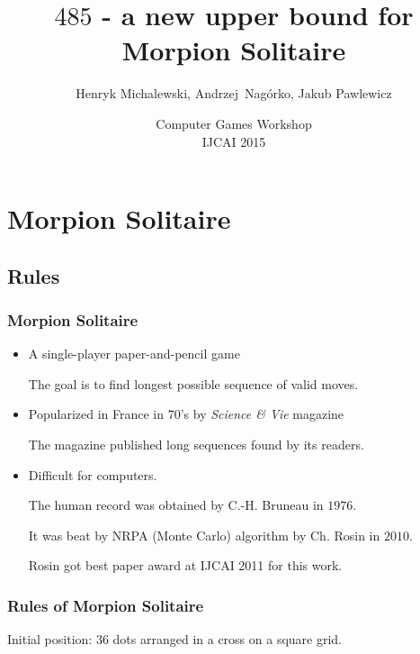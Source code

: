 \documentclass[pdftex]{beamer}
\title{$485$ - a new upper bound for Morpion Solitaire}
\author[H.~Michalewski, A.~Nagórko, J.~Pawlewicz]{Henryk Michalewski, Andrzej~Nag\'orko, Jakub Pawlewicz}
\institute[Warsaw]
{
University of Warsaw
}
\date[July 2015]{Computer Games Workshop\\\vspace{3mm} IJCAI 2015}
\begin{document}
\begin{frame}[plain]
  \titlepage

\end{frame}

%
%

\section{Morpion Solitaire}
\subsection{Rules}

\begin{frame}
\frametitle{Morpion Solitaire}

\begin{itemize}
\item A single-player paper-and-pencil game

\vspace{3mm}
{\footnotesize The goal is to find longest possible sequence of valid moves.}

\vspace{8mm}
\item Popularized in France in 70's by {\em Science \& Vie} magazine

\vspace{3mm}
{\footnotesize The magazine published long sequences found by its readers.}

\vspace{8mm}
\item Difficult for computers. 

\vspace{3mm}
{\footnotesize The human record was obtained by C.-H. Bruneau in $1976$.

\vspace{1mm}
It was beat by NRPA (Monte Carlo) algorithm by Ch. Rosin in $2010$.

\vspace{1mm}
Rosin got best paper award at IJCAI 2011 for this work.
}
\end{itemize}

\end{frame}

\begin{frame}
\frametitle{Rules of Morpion Solitaire}
\begin{center}


Initial position: $36$ dots arranged in a cross on a square grid.
\end{center}
\end{frame}
\end{document}
